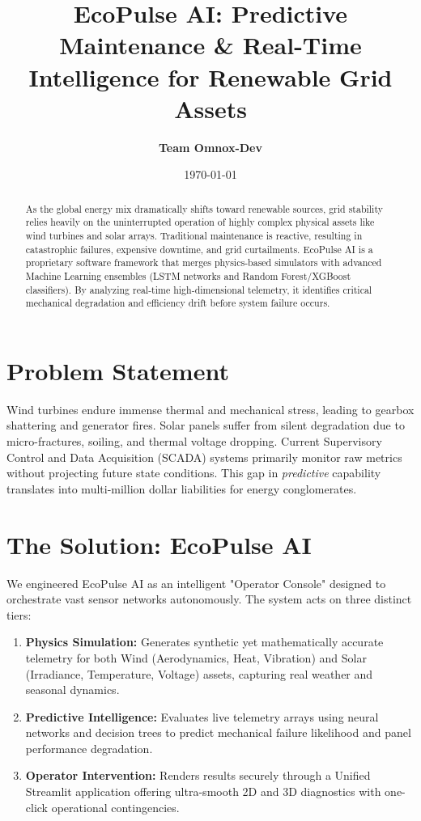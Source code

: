 \documentclass[12pt, a4paper]{article}
\title{\textbf{EcoPulse AI: Predictive Maintenance \& Real-Time Intelligence for Renewable Grid Assets}}
\author{\textbf{Team Omnox-Dev}}
\date{\today}
\begin{document}
\maketitle

\begin{abstract}
As the global energy mix dramatically shifts toward renewable sources, grid stability relies heavily on the uninterrupted operation of highly complex physical assets like wind turbines and solar arrays. Traditional maintenance is reactive, resulting in catastrophic failures, expensive downtime, and grid curtailments. EcoPulse AI is a proprietary software framework that merges physics-based simulators with advanced Machine Learning ensembles (LSTM networks and Random Forest/XGBoost classifiers). By analyzing real-time high-dimensional telemetry, it identifies critical mechanical degradation and efficiency drift before system failure occurs.
\end{abstract}

\section{Problem Statement}
Wind turbines endure immense thermal and mechanical stress, leading to gearbox shattering and generator fires. Solar panels suffer from silent degradation due to micro-fractures, soiling, and thermal voltage dropping. Current Supervisory Control and Data Acquisition (SCADA) systems primarily monitor raw metrics without projecting future state conditions. This gap in \textit{predictive} capability translates into multi-million dollar liabilities for energy conglomerates.

\section{The Solution: EcoPulse AI}
We engineered EcoPulse AI as an intelligent "Operator Console" designed to orchestrate vast sensor networks autonomously. The system acts on three distinct tiers:
\begin{enumerate}
    \item \textbf{Physics Simulation:} Generates synthetic yet mathematically accurate telemetry for both Wind (Aerodynamics, Heat, Vibration) and Solar (Irradiance, Temperature, Voltage) assets, capturing real weather and seasonal dynamics.
    \item \textbf{Predictive Intelligence:} Evaluates live telemetry arrays using neural networks and decision trees to predict mechanical failure likelihood and panel performance degradation.
    \item \textbf{Operator Intervention:} Renders results securely through a Unified Streamlit application offering ultra-smooth 2D and 3D diagnostics with one-click operational contingencies.
\end{enumerate}
\end{document}
